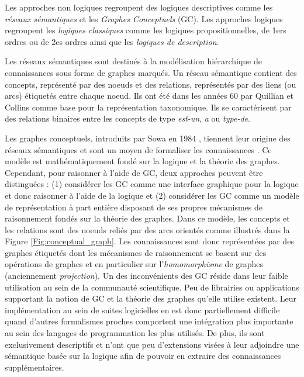 Les approches non logiques regroupent des logiques descriptives comme les \textit{réseaux sémantiques} et les \textit{Graphes Conceptuels} (GC).
Les approches logiques regroupent les \textit{logiques classiques} comme les logiques propositionnelles, de 1ers ordres ou de 2es ordres ainsi que les \textit{logiques de description}.


Les réseaux sémantiques sont destinés à la modélisation hiérarchique de connaissances sous forme de graphes marqués. Un réseau sémantique contient des concepts, représenté par des noeuds et des relations, représentés par des liens (ou arcs) étiquetés entre chaque noeud. Ils ont été dans les années 60 par Quillian et Collins \cite{collins1969retrieval} comme base pour la représentation taxonomique. Ils se caractérisent par des relations binaires entre les concepts de type \textit{est-un}, \textit{a} ou \textit{type-de}.


Les graphes conceptuels, introduits par Sowa en 1984 \cite{sowa1983conceptual}, tiennent leur origine des réseaux sémantiques \cite{lehmann1992semantic} et sont un moyen de formaliser les connaissances \cite{chein2008graph}. Ce modèle est mathématiquement fondé sur la logique et la théorie des graphes. Cependant, pour raisonner à l'aide de GC, deux approches peuvent être distinguées : (1) considérer les GC comme une interface graphique pour la logique et donc raisonner à l’aide de la logique et (2) considérer les GC comme un modèle de représentation à part entière disposant de ses propres mécanismes de raisonnement fondés sur la théorie des graphes. Dans ce modèle, les concepts et les relations sont des noeuds reliés par des arcs orientés comme illustrés dans la Figure \ref{Fig:conceptual_graph}. Les connaissances sont donc représentées par des graphes étiquetés dont les mécanismes de raisonnement se basent sur des opérations de graphes et en particulier sur l'\textit{homomorphisme} de graphes (anciennement \textit{projection}).
Un des inconvénients des GC réside dans leur faible utilisation au sein de la communauté scientifique. Peu de librairies ou applications supportant la notion de GC et la théorie des graphes qu'elle utilise existent. Leur implémentation au sein de suites logicielles en est donc partiellement difficile quand d'autres formalismes proches comportent une intégration plus importante au sein des langages de programmation les plus utilisés. De plus, ils sont exclusivement descriptifs et n'ont que peu d'extensions visées à leur adjoindre une sémantique basée sur la logique afin de pouvoir en extraire des connaissances supplémentaires.

